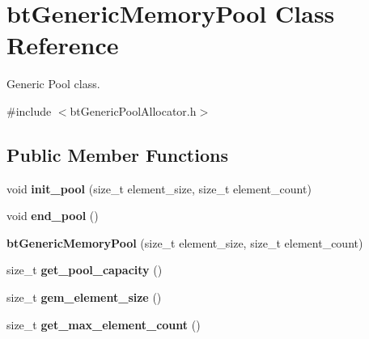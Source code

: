 \hypertarget{classbt_generic_memory_pool}{\section{bt\+Generic\+Memory\+Pool Class Reference}
\label{classbt_generic_memory_pool}
}


Generic Pool class.  




{\ttfamily \#include $<$bt\+Generic\+Pool\+Allocator.\+h$>$}

\subsection*{Public Member Functions}
\begin{DoxyCompactItemize}
\item 
\hypertarget{classbt_generic_memory_pool_a737c1ad587dc82b2fac01096ac0a7b41}{void {\bfseries init\+\_\+pool} (size\+\_\+t element\+\_\+size, size\+\_\+t element\+\_\+count)}\label{classbt_generic_memory_pool_a737c1ad587dc82b2fac01096ac0a7b41}

\item 
\hypertarget{classbt_generic_memory_pool_a7830d0b91b596c10b52da3b4ade2e41d}{void {\bfseries end\+\_\+pool} ()}\label{classbt_generic_memory_pool_a7830d0b91b596c10b52da3b4ade2e41d}

\item 
\hypertarget{classbt_generic_memory_pool_a2507290a6ad7e0e04f81da3a7d97caeb}{{\bfseries bt\+Generic\+Memory\+Pool} (size\+\_\+t element\+\_\+size, size\+\_\+t element\+\_\+count)}\label{classbt_generic_memory_pool_a2507290a6ad7e0e04f81da3a7d97caeb}

\item 
\hypertarget{classbt_generic_memory_pool_acf029799be7eb09e276e27bb2296e14a}{size\+\_\+t {\bfseries get\+\_\+pool\+\_\+capacity} ()}\label{classbt_generic_memory_pool_acf029799be7eb09e276e27bb2296e14a}

\item 
\hypertarget{classbt_generic_memory_pool_a728395d36923dd3f480d0320dfb0a3f2}{size\+\_\+t {\bfseries gem\+\_\+element\+\_\+size} ()}\label{classbt_generic_memory_pool_a728395d36923dd3f480d0320dfb0a3f2}

\item 
\hypertarget{classbt_generic_memory_pool_ad4a523dabab835e0e786661b628dbb6b}{size\+\_\+t {\bfseries get\+\_\+max\+\_\+element\+\_\+count} ()}\label{classbt_generic_memory_pool_ad4a523dabab835e0e786661b628dbb6b}


\end{DoxyCompactItemize}
